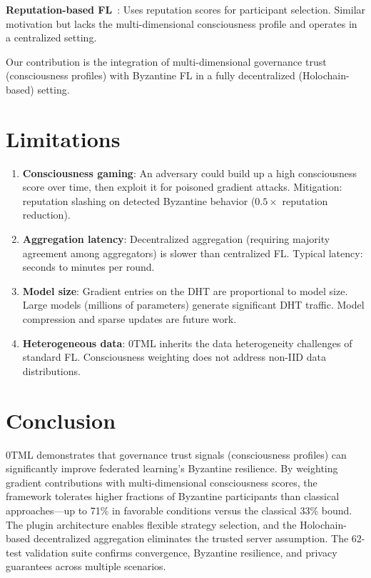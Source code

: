 \documentclass[11pt,twocolumn]{article}
\begin{document}
\textbf{Reputation-based FL}~\cite{kang2019}: Uses reputation scores
for participant selection. Similar motivation but lacks the multi-dimensional
consciousness profile and operates in a centralized setting.

Our contribution is the integration of multi-dimensional governance trust
(consciousness profiles) with Byzantine FL in a fully decentralized
(Holochain-based) setting.

\section{Limitations}

\begin{enumerate}
  \item \textbf{Consciousness gaming}: An adversary could build up a high
    consciousness score over time, then exploit it for poisoned gradient
    attacks. Mitigation: reputation slashing on detected Byzantine behavior
    ($0.5\times$ reputation reduction).
  \item \textbf{Aggregation latency}: Decentralized aggregation (requiring
    majority agreement among aggregators) is slower than centralized FL.
    Typical latency: seconds to minutes per round.
  \item \textbf{Model size}: Gradient entries on the DHT are proportional
    to model size. Large models (millions of parameters) generate significant
    DHT traffic. Model compression and sparse updates are future work.
  \item \textbf{Heterogeneous data}: 0TML inherits the data heterogeneity
    challenges of standard FL. Consciousness weighting does not address
    non-IID data distributions.
\end{enumerate}

\section{Conclusion}

0TML demonstrates that governance trust signals (consciousness profiles)
can significantly improve federated learning's Byzantine resilience. By
weighting gradient contributions with multi-dimensional consciousness
scores, the framework tolerates higher fractions of Byzantine participants
than classical approaches---up to 71\% in favorable conditions versus the
classical 33\% bound. The plugin architecture enables flexible strategy
selection, and the Holochain-based decentralized aggregation eliminates
the trusted server assumption. The 62-test validation suite confirms
convergence, Byzantine resilience, and privacy guarantees across multiple
scenarios.
\end{document}
